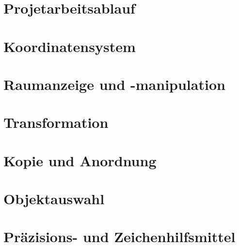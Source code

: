 \section{Projetarbeitsablauf}

\section{Koordinatensystem}

\section{Raumanzeige und -manipulation}

\section{Transformation}

\section{Kopie und Anordnung}

\section{Objektauswahl}

\section{Präzisions- und Zeichenhilfsmittel}









